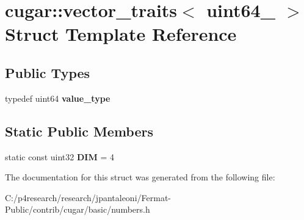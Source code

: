 \hypertarget{structcugar_1_1vector__traits_3_01uint64__4_01_4}{}\section{cugar\+:\+:vector\+\_\+traits$<$ uint64\+\_ $>$ Struct Template Reference}
\label{structcugar_1_1vector__traits_3_01uint64__4_01_4}
\subsection*{Public Types}
\begin{DoxyCompactItemize}
\item 
\mbox{\label{structcugar_1_1vector__traits_3_01uint64__4_01_4_a7adc0bd661bf7e2ed4ec5cebaebe15c4}} 
typedef uint64 {\bfseries value\+\_\+type}
\end{DoxyCompactItemize}
\subsection*{Static Public Members}
\begin{DoxyCompactItemize}
\item 
\mbox{\label{structcugar_1_1vector__traits_3_01uint64__4_01_4_a4d076069f30de3cd524de02aae82d410}} 
static const uint32 {\bfseries D\+IM} = 4
\end{DoxyCompactItemize}


The documentation for this struct was generated from the following file\+:\begin{DoxyCompactItemize}
\item 
C\+:/p4research/research/jpantaleoni/\+Fermat-\/\+Public/contrib/cugar/basic/numbers.\+h\end{DoxyCompactItemize}
